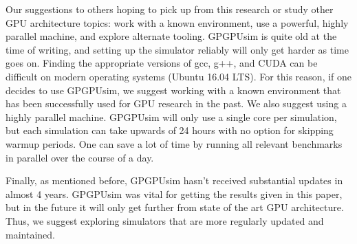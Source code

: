 Our suggestions to others hoping to pick up from this research or study other GPU architecture topics: work with a known environment, use a powerful, highly parallel machine, and explore alternate tooling. GPGPUsim is quite old at the time of writing, and setting up the simulator reliably will only get harder as time goes on. Finding the appropriate versions of gcc, g++, and CUDA can be difficult on modern operating systems (Ubuntu 16.04 LTS). For this reason, if one decides to use GPGPUsim, we suggest working with a known environment that has been successfully used for GPU research in the past. We also suggest using a highly parallel machine. GPGPUsim will only use a single core per simulation, but each simulation can take upwards of 24 hours with no option for skipping warmup periods. One can save a lot of time by running all relevant benchmarks in parallel over the course of a day.

Finally, as mentioned before, GPGPUsim hasn't received substantial updates in almost 4 years. GPGPUsim was vital for getting the results given in this paper, but in the future it will only get further from state of the art GPU architecture. Thus, we suggest exploring simulators that are more regularly updated and maintained.
